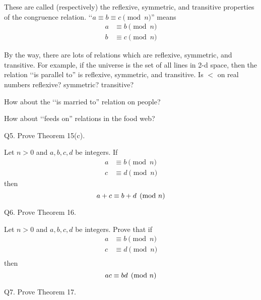 \documentclass[a4paper,12pt]{article}
\begin{document}
These are called (respectively) the reflexive, symmetric, and 
transitive properties of the congruence relation.
\lq\lq $a \equiv b \equiv c \pmod{n}$'' means
\begin{align*}
a &\equiv b \pmod{n} \\
b &\equiv c \pmod{n}
\end{align*}

By the way, there are lots of relations which are reflexive, symmetric,
and transitive.
For example, if the universe is the set of all lines in 2-d space,
then the relation \lq\lq is parallel to'' is reflexive,
symmetric, and transitive.
Is $<$ on real numbers reflexive? symmetric? transitive?

How about the \lq\lq is married to'' relation on people?

How about \lq\lq feeds on'' relations in the food web?


\newpage

Q5. Prove Theorem 15(c).

\SOLUTION



\newpage

\begin{thm} Let $n > 0$ and $a,b,c,d$ be integers.
If
\begin{align*}
a &\equiv b \pmod{n} \\
c &\equiv d \pmod{n}
\end{align*}
then
\[
a+c \equiv b+d \pmod{n} \\
\]
\end{thm}

\newpage 

Q6. Prove Theorem 16.

\SOLUTION


\newpage



\begin{thm}
Let $n > 0$ and $a,b,c,d$ be integers.
Prove that if
\begin{align*}
a &\equiv b \pmod{n} \\
c &\equiv d \pmod{n} \\
\end{align*}
then
\[
ac \equiv bd \pmod{n} \\
\]
\end{thm}


\newpage

Q7. Prove Theorem 17.


\SOLUTION

\newpage
\end{document}
